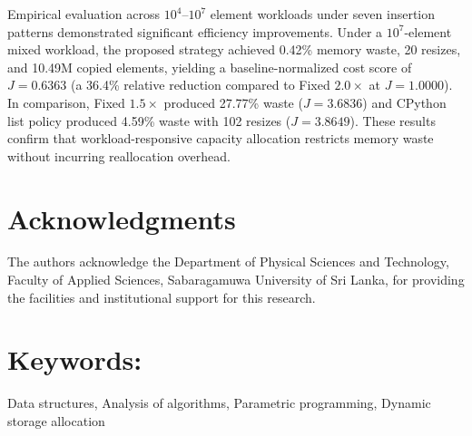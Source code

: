 \documentclass[twoside, 10pt, a4paper]{article}
\begin{document}
Empirical evaluation across $10^4$--$10^7$ element workloads under seven insertion patterns demonstrated significant efficiency improvements. Under a $10^7$-element mixed workload, the proposed strategy achieved 0.42\% memory waste, 20 resizes, and 10.49M copied elements, yielding a baseline-normalized cost score of $J = 0.6363$ (a 36.4\% relative reduction compared to Fixed $2.0\times$ at $J = 1.0000$). In comparison, Fixed $1.5\times$ produced 27.77\% waste ($J = 3.6836$) and CPython list policy produced 4.59\% waste with 102 resizes ($J = 3.8649$). These results confirm that workload-responsive capacity allocation restricts memory waste without incurring reallocation overhead.

\section*{Acknowledgments}
The authors acknowledge the Department of Physical Sciences and Technology, Faculty of Applied Sciences, Sabaragamuwa University of Sri Lanka, for providing the facilities and institutional support for this research.

\section*{Keywords:}
\small {Data structures, Analysis of algorithms, Parametric programming, Dynamic storage allocation}
\end{document}
